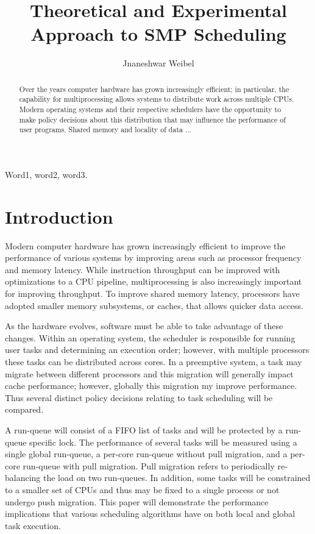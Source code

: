 \documentclass{cys}
\title{Theoretical and Experimental Approach to SMP Scheduling}
\author{Jnaneshwar Weibel}
\begin{document}
\maketitle

\begin{abstract}
Over the years computer hardware has grown increasingly efficient; in particular, the capability for multiprocessing allows systems to distribute work across multiple CPUs.  Modern operating systems and their respective schedulers have the opportunity to make policy decisions about this distribution that may influence the performance of user programs.  Shared memory and locality of data ...
\end{abstract}

\begin{keywords} 
Word1, word2, word3.
\end{keywords} 

\section{Introduction}
\label{sec:introduction}
Modern computer hardware has grown increasingly efficient to improve the performance of various systems by improving areas such as processor frequency and memory latency.   While instruction throughput can be improved with optimizations to a CPU pipeline, multiprocessing is also increasingly important for improving throughput.  To improve shared memory latency, processors have adopted smaller memory subsystems, or caches, that allows quicker data access.

As the hardware evolves, software must be able to take advantage of these changes.  Within an operating system, the scheduler is responsible for running user tasks and determining an execution order; however, with multiple processors these tasks can be distributed across cores.  In a preemptive system, a task may migrate between different processors and this migration will generally impact cache performance; however, globally this migration my improve performance.  Thus several distinct policy decisions relating to task scheduling will be compared.

A run-queue will consist of a FIFO list of tasks and will be protected by a run-queue specific lock.  The performance of several tasks will be measured using a single global run-queue, a per-core run-queue without pull migration, and a per-core run-queue with pull migration.  Pull migration refers to periodically re-balancing the load on two run-queues.  In addition, some tasks will be constrained to a smaller set of CPUs and thus may be fixed to a single process or not undergo push migration.  This paper will demonstrate the performance implications that various scheduling algorithms have on both local and global task execution.
\end{document}
